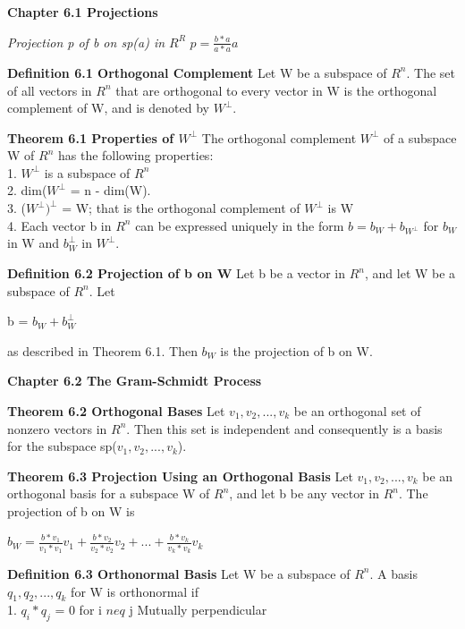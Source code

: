 \documentclass{article}
\begin{document}
\textbf {Chapter 6.1 Projections}

\textit {Projection p of b on sp(a) in $R^R$}
$p = \frac{b * a}{a * a} a$

\textbf {Definition 6.1 Orthogonal Complement} Let W be a subspace of $R^n$. The set of all vectors in $R^n$ that are orthogonal to every vector in W is the orthogonal complement of W, and is denoted by $W^{\perp}$.

\textbf {Theorem 6.1 Properties of $W^{\perp}$}
The orthogonal complement $W^{\perp}$ of a subspace W of $R^n$ has the following properties: \\
1. $W^{\perp}$ is a subspace of $R^n$ \\
2. dim($W^{\perp}$ = n - dim(W). \\
3. ($W^{\perp})^{\perp}$ = W; that is the orthogonal complement of $W^{\perp}$ is W \\
4. Each vector b in $R^n$ can be expressed uniquely in the form $b = b_W + b_{W^{\perp}}$ for $b_W$ in W and $b_W^{\perp}$ in $W^{\perp}$.

\textbf {Definition 6.2 Projection of b on W}
Let b be a vector in $R^n$, and let W be a subspace of $R^n$. Let 
\begin{center}
b = $b_W + b_W^{\perp}$
\end{center}

as described in Theorem 6.1. Then $b_W$ is the projection of b on W.

\textbf {Chapter 6.2 The Gram-Schmidt Process}

\textbf {Theorem 6.2 Orthogonal Bases} Let {$v_1, v_2,...,v_k$} be an orthogonal set of nonzero vectors in $R^n$. Then this set is independent and consequently is a basis for the subspace sp($v_1,v_2,...,v_k$).

\textbf {Theorem 6.3 Projection Using an Orthogonal Basis} Let {$v_1, v_2, ... , v_k$} be an orthogonal basis for a subspace W of $R^n$, and let b be any vector in $R^n$. The projection of b on W is 
\begin{center}
$b_W = {\frac{b*v_1}{v_1 * v_1}v_1} + {\frac{b * v_2}{v_2 * v_2} v_2} + ... + {\frac{b * v_k}{v_k * v_k} v_k}$
\end{center}

\textbf {Definition 6.3 Orthonormal Basis} Let W be a subspace of $R^n$. A basis {$q_1, q_2,..., q_k$} for W is orthonormal if \\
1. $q_i * q_j$ = 0 for i $neq$ j       Mutually perpendicular \\
\end{document}
